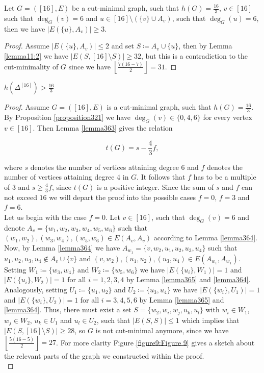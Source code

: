 \begin{lem}\label{lemma368}
Let \(G=([16],E)\) be a cut-minimal graph, such that \(h(G)=\frac{16}{3}\), \(v\in [16]\) such that \(\deg_G(v)=6\) and \(u\in [16]\setminus (\{v\}\cup A_v)\), such that \(\deg_G(u)=6\), then we have \(|E(\{u\},A_v)|\geq 3\).
\begin{proof}
Assume \(|E(\{u\},A_v)|\leq 2\) and set \(S\coloneqq A_v\cup\{u\}\), then by Lemma \ref{lemma11:2} we have \(|E(S,[16]\setminus S)|\geq 32\), but this is a contradiction to the cut-minimality of \(G\) since we have \(\left\lfloor\frac{7(16-7)}{2}\right\rfloor=31\).
\end{proof}
\end{lem}

\begin{thm}\label{theoremn=16}
\(h(\Delta^{[16]})>\frac{16}{3}\)
\begin{proof}
Assume \(G=([16],E)\) is a cut-minimal graph, such that \(h(G)=\frac{16}{3}\). By Proposition \ref{proposition321} we have \(\deg_G(v)\in\{0,4,6\}\) for every vertex \(v\in [16]\). Then Lemma \ref{lemma363} gives the relation

\begin{equation}\label{equation361}
t(G)=s-\frac{4}{3}f,
\end{equation}

where \(s\) denotes the number of vertices attaining degree \(6\) and \(f\) denotes the number of vertices attaining degree \(4\) in \(G\). It follows that \(f\) has to be a multiple of \(3\) and \(s\geq\frac{4}{3}f\), since \(t(G)\) is a positive integer. Since the sum of \(s\) and \(f\) can not exceed \(16\) we will depart the proof into the possible cases \(f=0\), \(f=3\) and \(f=6\).\\
Let us begin with the case \(f=0\). Let \(v\in [16]\), such that \(\deg_G(v)=6\) and denote \(A_v=\{w_1,w_2,w_3,w_4,w_5,w_6\}\) such that \((w_1,w_2),(w_3,w_4),(w_5,w_6)\in E(A_v,A_v)\) according to Lemma \ref{lemma364}. Now, by Lemma \ref{lemma364} we have \(A_{w_1}=\{v,w_2,u_1,u_2,u_3,u_4\}\) such that \(u_1,u_2,u_3,u_4\notin A_v\cup \{v\}\) and \((v,w_2),(u_1,u_2),(u_3,u_4)\in E(A_{w_1},A_{w_1})\). Setting \(W_1\coloneqq\{w_3,w_4\}\) and \(W_2\coloneqq\{w_5,w_6\}\) we have \(|E(\{u_i\},W_1)|=1\) and\\
\(|E(\{u_i\},W_2)|=1\) for all \(i=1,2,3,4\) by Lemma \ref{lemma365} and \ref{lemma364}. Analogously, setting \(U_1\coloneqq\{u_1,u_2\}\) and \(U_2\coloneqq\{u_3,u_4\}\) we have \(|E(\{w_i\},U_1)|=1\) and \(|E(\{w_i\},U_2)|=1\) for all \(i=3,4,5,6\) by Lemma \ref{lemma365} and \ref{lemma364}. Thus, there must exist a set \(S=\{w_2,w_i,w_j,u_k,u_l\}\) with \(w_i\in W_1\), \(w_j\in W_2\), \(u_k\in U_1\) and \(u_l\in U_2\), such that \(|E(S,S)|\leq 1\) which implies that \(|E(S,[16]\setminus S)|\geq 28\), so \(G\) is not cut-minimal anymore, since we have \(\left\lfloor\frac{5(16-5)}{2}\right\rfloor=27\). For more clarity Figure \ref{figure9:Figure 9} gives a sketch about the relevant parts of the graph we constructed within the proof.\\


\end{proof}
\end{thm}
